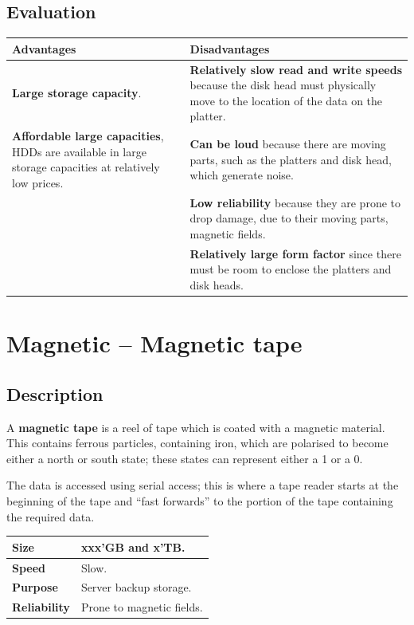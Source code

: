 \documentclass[a4paper]{systems-software}
\begin{document}
\subsection*{Evaluation}

\begin{longtabu} to \textwidth {| X[1,l] | X[1,l] |}
    \hline
    \textbf{Advantages} & \textbf{Disadvantages}
	\\ \hline
	\textbf{Large storage capacity}. & \textbf{Relatively slow read and write speeds} because the disk head must physically move to the location of the data on the platter.
	\\ \hline
	\textbf{Affordable large capacities}, HDDs are available in large storage capacities at relatively low prices. & \textbf{Can be loud} because there are moving parts, such as the platters and disk head, which generate noise.
	\\ \hline
	& \textbf{Low reliability} because they are prone to drop damage, due to their moving parts, magnetic fields.
	\\ \hline
	& \textbf{Relatively large form factor} since there must be room to enclose the platters and disk heads.
	\\ \hline
\end{longtabu}


\section*{Magnetic -- Magnetic tape}

\subsection*{Description}

A \textbf{magnetic tape} is a reel of tape which is coated with a magnetic material. This contains ferrous particles, containing iron, which are polarised to become either a north or south state; these states can represent either a 1 or a 0.

The data is accessed using serial access; this is where a tape reader starts at the beginning of the tape and “fast forwards” to the portion of the tape containing the required data.

\newpage

\begin{longtabu} to \textwidth {| X[1,l] | X[6,l] |}
    \hline
    \textbf{Size} & xxx’GB and x’TB.
	\\ \hline
	\textbf{Speed} & Slow.
	\\ \hline
	\textbf{Purpose} & Server backup storage.
	\\ \hline
	\textbf{Reliability} & Prone to magnetic fields.
	\\ \hline
\end{longtabu}
\end{document}
